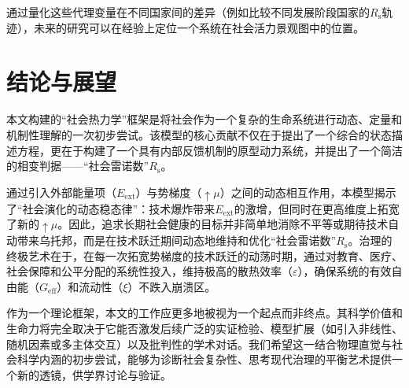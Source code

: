 \documentclass[twocolumn]{ctexart}
\newcommand{\upmu}{\uparrow\!\mu}
\newcommand{\upxi}{\xi}
\newcommand{\Geff}{G_{\mathrm{eff}}}
\newcommand{\Eext}{E_{\mathrm{ext}}}
\newcommand{\Rs}{R_{\mathrm{s}}}
\newcommand{\veps}{\varepsilon}
\begin{document}
通过量化这些代理变量在不同国家间的差异（例如比较不同发展阶段国家的$\Rs$轨迹），未来的研究可以在经验上定位一个系统在社会活力景观图中的位置。

\section{结论与展望}

本文构建的“社会热力学”框架是将社会作为一个复杂的生命系统进行动态、定量和机制性理解的一次初步尝试\cite{qian2001complex,liu2010dynamics}。该模型的核心贡献不仅在于提出了一个综合的状态描述方程，更在于构建了一个具有内部反馈机制的原型动力系统，并提出了一个简洁的相变判据——“社会雷诺数”$\Rs$。

通过引入外部能量项（$\Eext$）与势梯度（$\upmu$）之间的动态相互作用，本模型揭示了“社会演化的动态稳态律”：技术爆炸带来$\Eext$的激增，但同时在更高维度上拓宽了新的$\upmu$。因此，追求长期社会健康的目标并非简单地消除不平等或期待技术自动带来乌托邦，而是在技术跃迁期间动态地维持和优化“社会雷诺数”$\Rs$。治理的终极艺术在于，在每一次拓宽势梯度的技术跃迁的动荡时期，通过对教育、医疗、社会保障和公平分配的系统性投入，维持极高的散热效率（$\veps$），确保系统的有效自由能（$\Geff$）和流动性（$\upxi$）不跌入崩溃区。

作为一个理论框架，本文的工作应更多地被视为一个起点而非终点。其科学价值和生命力将完全取决于它能否激发后续广泛的实证检验、模型扩展（如引入非线性、随机因素或多主体交互）以及批判性的学术对话。我们希望这一结合物理直觉与社会科学内涵的初步尝试，能够为诊断社会复杂性、思考现代治理的平衡艺术提供一个新的透镜，供学界讨论与验证。
\end{document}
